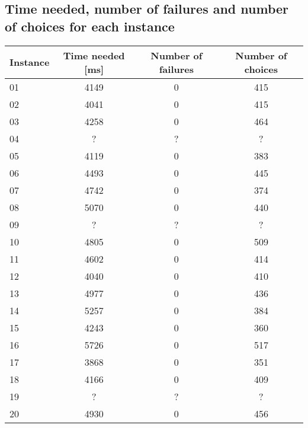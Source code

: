 \documentclass{eplDoc}
\begin{document}
\subsection{Time needed, number of failures and number of choices for each instance}
\begin{center}
		\begin{tabular}{|l|c|c|c|}
			\hline
			Instance & Time needed [ms] & Number of failures & Number of choices \\ 
			\hline
			01 & 4149 & 0 & 415 \\ 
			02 & 4041 & 0 & 415 \\ 
			03 & 4258 & 0 & 464 \\ 
			04 & ? & ? & ? \\ 
			05 & 4119 & 0 & 383 \\ 
			06 & 4493 & 0 & 445 \\ 
			07 & 4742 & 0 & 374 \\ 
			08 & 5070 & 0 & 440 \\ 
			09 & ? & ? & ? \\ 
			10 & 4805 & 0 & 509 \\ 
			11 & 4602 & 0 & 414 \\ 
			12 & 4040 & 0 & 410 \\ 
			13 & 4977 & 0 & 436 \\ 
			14 & 5257 & 0 & 384 \\ 
			15 & 4243 & 0 & 360 \\ 
			16 & 5726 & 0 & 517 \\ 
			17 & 3868 & 0 & 351 \\ 
			18 & 4166 & 0 & 409 \\ 
			19 & ? & ? & ? \\ 
			20 & 4930 & 0 & 456 \\
			\hline
		\end{tabular}
\end{center}
\end{document}

